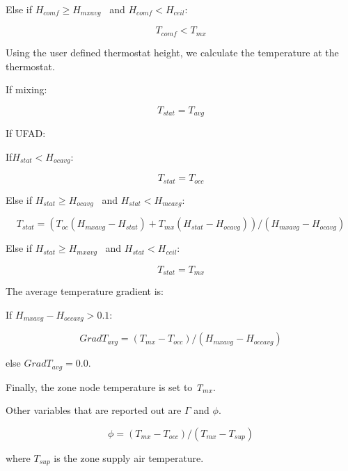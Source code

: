 Else if \({H_{comf}} \ge {H_{mxavg}}\) ~and \({H_{comf}} < {H_{ceil}}\):

\begin{equation}
{T_{comf}} < {T_{mx}}
\end{equation}

Using the user defined thermostat height, we calculate the temperature at the thermostat.

If mixing:

\begin{equation}
{T_{stat}} = {T_{avg}}
\end{equation}

If UFAD:

If\({H_{stat}} < {H_{ocavg}}\):

\begin{equation}
{T_{stat}} = {T_{occ}}
\end{equation}

Else if \({H_{stat}} \ge {H_{ocavg}}\) ~and \({H_{stat}} < {H_{mcavg}}\):

\begin{equation}
{T_{stat}} = \left( {{T_{oc}}\left( {{H_{mxavg}} - {H_{stat}}} \right) + {T_{mx}}\left( {{H_{stat}} - {H_{ocavg}}} \right)} \right)/\left( {{H_{mxavg}} - {H_{ocavg}}} \right)
\end{equation}

Else if \({H_{stat}} \ge {H_{mxavg}}\) ~and \({H_{stat}} < {H_{ceil}}\):

\begin{equation}
{T_{stat}} = {T_{mx}}
\end{equation}

The average temperature gradient is:

If \({H_{mxavg}} - {H_{occavg}} > 0.1\):

\begin{equation}
Grad{T_{avg}} = ({T_{mx}} - {T_{occ}})/({H_{mxavg}} - {H_{occavg}})
\end{equation}

else \(Grad{T_{avg}} = 0.0\).

Finally, the zone node temperature is set to \emph{T\(_{mx}\)}.

Other variables that are reported out are \(\Gamma\) and \(\phi\).

\begin{equation}
\phi  = ({T_{mx}} - {T_{occ}})/({T_{mx}} - {T_{sup}})
\end{equation}

where \({T_{sup}}\) is the zone supply air temperature.

